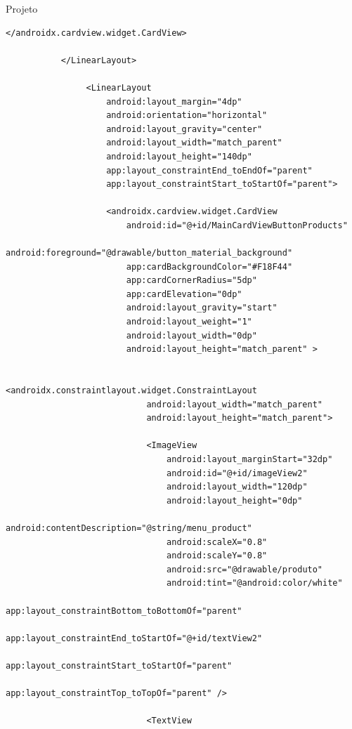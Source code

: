 \documentclass[
	12pt,				%
	openright,			%
	twoside,			%
	a4paper,			%
	english,			%
	french,				%
	spanish,			%
	brazil				%
	]{abntex2}
\begin{document}
\begin{chapter}{Projeto}
\begin{lstlisting}[numbers=none,
basicstyle=\small,
caption={Fragment Main.xml},
title={Fragment Main.xml},
xleftmargin=4pt,
label={fragment_main.xml}]
                </androidx.cardview.widget.CardView>

           </LinearLayout>

                <LinearLayout
                    android:layout_margin="4dp"
                    android:orientation="horizontal"
                    android:layout_gravity="center"
                    android:layout_width="match_parent"
                    android:layout_height="140dp"
                    app:layout_constraintEnd_toEndOf="parent"
                    app:layout_constraintStart_toStartOf="parent">

                    <androidx.cardview.widget.CardView
                        android:id="@+id/MainCardViewButtonProducts"
                        android:foreground="@drawable/button_material_background"
                        app:cardBackgroundColor="#F18F44"
                        app:cardCornerRadius="5dp"
                        app:cardElevation="0dp"
                        android:layout_gravity="start"
                        android:layout_weight="1"
                        android:layout_width="0dp"
                        android:layout_height="match_parent" >

                        <androidx.constraintlayout.widget.ConstraintLayout
                            android:layout_width="match_parent"
                            android:layout_height="match_parent">

                            <ImageView
                                android:layout_marginStart="32dp"
                                android:id="@+id/imageView2"
                                android:layout_width="120dp"
                                android:layout_height="0dp"
                                android:contentDescription="@string/menu_product"
                                android:scaleX="0.8"
                                android:scaleY="0.8"
                                android:src="@drawable/produto"
                                android:tint="@android:color/white"
                                app:layout_constraintBottom_toBottomOf="parent"
                                app:layout_constraintEnd_toStartOf="@+id/textView2"
                                app:layout_constraintStart_toStartOf="parent"
                                app:layout_constraintTop_toTopOf="parent" />

                            <TextView


\end{lstlisting}
\end{chapter}
\end{document}

